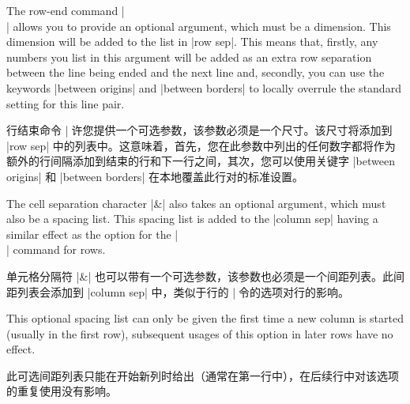The row-end command |\\| allows you to provide an optional argument, which must
be a dimension. This dimension will be added to the list in |row sep|. This
means that, firstly, any numbers you list in this argument will be added as an
extra row separation between the line being ended and the next line and,
secondly, you can use the keywords |between origins| and |between borders| to
locally overrule the standard setting for this line pair.
%

行结束命令 |\| 允许您提供一个可选参数，该参数必须是一个尺寸。该尺寸将添加到 |row sep| 中的列表中。这意味着，首先，您在此参数中列出的任何数字都将作为额外的行间隔添加到结束的行和下一行之间，其次，您可以使用关键字 |between origins| 和 |between borders| 在本地覆盖此行对的标准设置。

\begin{codeexample}[]
\end{codeexample}

The cell separation character |&| also takes an optional argument, which must
also be a spacing list. This spacing list is added to the |column sep| having a
similar effect as the option for the |\\| command for rows.

单元格分隔符 |&| 也可以带有一个可选参数，该参数也必须是一个间距列表。此间距列表会添加到 |column sep| 中，类似于行的 |\| 命令的选项对行的影响。

This optional spacing list can only be given the first time a new column is
started (usually in the first row), subsequent usages of this option in later
rows have no effect.

此可选间距列表只能在开始新列时给出（通常在第一行中），在后续行中对该选项的重复使用没有影响。

